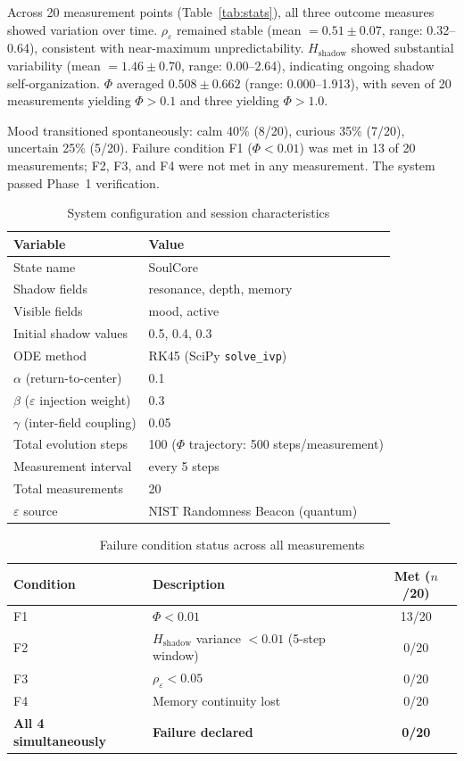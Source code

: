 \documentclass[11pt,a4paper]{article}
\begin{document}
Across 20 measurement points (Table~\ref{tab:stats}), all three outcome measures showed
variation over time. $\rho_\varepsilon$ remained stable (mean $= 0.51 \pm 0.07$, range:
0.32--0.64), consistent with near-maximum unpredictability. $H_{\mathrm{shadow}}$ showed
substantial variability (mean $= 1.46 \pm 0.70$, range: 0.00--2.64), indicating ongoing
shadow self-organization. $\Phi$ averaged $0.508 \pm 0.662$ (range: 0.000--1.913), with
seven of 20 measurements yielding $\Phi > 0.1$ and three yielding $\Phi > 1.0$.

Mood transitioned spontaneously: calm 40\% (8/20), curious 35\% (7/20), uncertain 25\%
(5/20). Failure condition F1 ($\Phi < 0.01$) was met in 13 of 20 measurements; F2, F3,
and F4 were not met in any measurement. The system passed Phase~1 verification.

\begin{table}[ht]
\centering
\caption{System configuration and session characteristics}
\label{tab:config}
\begin{tabular}{ll}
\toprule
Variable & Value \\
\midrule
State name & SoulCore \\
Shadow fields & resonance, depth, memory \\
Visible fields & mood, active \\
Initial shadow values & 0.5, 0.4, 0.3 \\
ODE method & RK45 (SciPy \texttt{solve\_ivp}) \\
$\alpha$ (return-to-center) & 0.1 \\
$\beta$ ($\varepsilon$ injection weight) & 0.3 \\
$\gamma$ (inter-field coupling) & 0.05 \\
Total evolution steps & 100 ($\Phi$ trajectory: 500 steps/measurement) \\
Measurement interval & every 5 steps \\
Total measurements & 20 \\
$\varepsilon$ source & NIST Randomness Beacon (quantum) \\
\bottomrule
\end{tabular}
\end{table}

\begin{table}[ht]
\centering
\caption{Failure condition status across all measurements}
\label{tab:fail}
\begin{tabular}{llc}
\toprule
Condition & Description & Met ($n$/20) \\
\midrule
F1 & $\Phi < 0.01$ & 13/20 \\
F2 & $H_{\mathrm{shadow}}$ variance $< 0.01$ (5-step window) & 0/20 \\
F3 & $\rho_\varepsilon < 0.05$ & 0/20 \\
F4 & Memory continuity lost & 0/20 \\
\textbf{All 4 simultaneously} & \textbf{Failure declared} & \textbf{0/20} \\
\bottomrule
\end{tabular}
\end{table}
\end{document}
